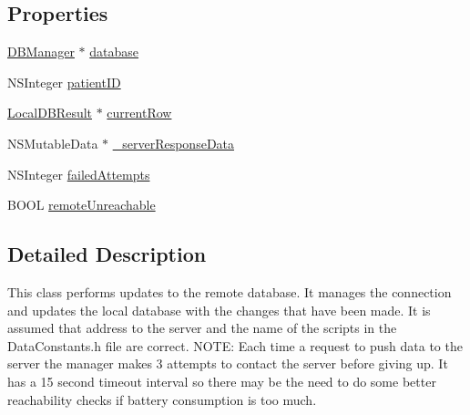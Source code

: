 \subsection*{Properties}
\begin{DoxyCompactItemize}
\item 
\hyperlink{interface_d_b_manager}{D\-B\-Manager} $\ast$ \hyperlink{interface_remote_d_b_connection_manager_aea31c73a0a3e36095f04688a9b51b594}{database}
\item 
N\-S\-Integer \hyperlink{interface_remote_d_b_connection_manager_a984d4293c7de824df8ab8b7a8510c15e}{patient\-I\-D}
\item 
\hyperlink{interface_local_d_b_result}{Local\-D\-B\-Result} $\ast$ \hyperlink{interface_remote_d_b_connection_manager_a1cf642f7f159dedf3f805ae62f86f0ee}{current\-Row}
\item 
N\-S\-Mutable\-Data $\ast$ \hyperlink{interface_remote_d_b_connection_manager_a6956166be867026a4ed5c9552c2fbc85}{\-\_\-server\-Response\-Data}
\item 
N\-S\-Integer \hyperlink{interface_remote_d_b_connection_manager_aea06d1743882f6b59247e590cdd0513f}{failed\-Attempts}
\item 
B\-O\-O\-L \hyperlink{interface_remote_d_b_connection_manager_ad3cb931f4c5147c3595679f241a0bf48}{remote\-Unreachable}
\end{DoxyCompactItemize}


\subsection{Detailed Description}
This class performs updates to the remote database. It manages the connection and updates the local database with the changes that have been made. It is assumed that address to the server and the name of the scripts in the Data\-Constants.\-h file are correct. N\-O\-T\-E\-: Each time a request to push data to the server the manager makes 3 attempts to contact the server before giving up. It has a 15 second timeout interval so there may be the need to do some better reachability checks if battery consumption is too much. 


